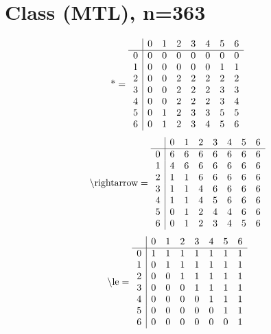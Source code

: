 \documentclass[11pt]{article}
\begin{document}
\section{Class (MTL), n=363}
\[\text{*} = 
\begin{array}{r | r r r r r r r}
 & 0 & 1 & 2 & 3 & 4 & 5 & 6 \\ \hline
0 & 0 & 0 & 0 & 0 & 0 & 0 & 0 \\
1 & 0 & 0 & 0 & 0 & 0 & 1 & 1 \\
2 & 0 & 0 & 2 & 2 & 2 & 2 & 2 \\
3 & 0 & 0 & 2 & 2 & 2 & 3 & 3 \\
4 & 0 & 0 & 2 & 2 & 2 & 3 & 4 \\
5 & 0 & 1 & 2 & 3 & 3 & 5 & 5 \\
6 & 0 & 1 & 2 & 3 & 4 & 5 & 6 \\
\end{array}
\]
\[\text{\textbackslash rightarrow} = 
\begin{array}{r | r r r r r r r}
 & 0 & 1 & 2 & 3 & 4 & 5 & 6 \\ \hline
0 & 6 & 6 & 6 & 6 & 6 & 6 & 6 \\
1 & 4 & 6 & 6 & 6 & 6 & 6 & 6 \\
2 & 1 & 1 & 6 & 6 & 6 & 6 & 6 \\
3 & 1 & 1 & 4 & 6 & 6 & 6 & 6 \\
4 & 1 & 1 & 4 & 5 & 6 & 6 & 6 \\
5 & 0 & 1 & 2 & 4 & 4 & 6 & 6 \\
6 & 0 & 1 & 2 & 3 & 4 & 5 & 6 \\
\end{array}
\]
\[\text{\textbackslash le} = 
\begin{array}{r | r r r r r r r}
 & 0 & 1 & 2 & 3 & 4 & 5 & 6 \\ \hline
0 & 1 & 1 & 1 & 1 & 1 & 1 & 1 \\
1 & 0 & 1 & 1 & 1 & 1 & 1 & 1 \\
2 & 0 & 0 & 1 & 1 & 1 & 1 & 1 \\
3 & 0 & 0 & 0 & 1 & 1 & 1 & 1 \\
4 & 0 & 0 & 0 & 0 & 1 & 1 & 1 \\
5 & 0 & 0 & 0 & 0 & 0 & 1 & 1 \\
6 & 0 & 0 & 0 & 0 & 0 & 0 & 1 \\
\end{array}
\]
\end{document}

